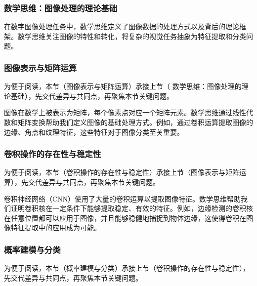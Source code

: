 \subsubsection{  数学思维：图像处理的理论基础}



在数字图像处理任务中，数学思维定义了图像数据的处理方式以及背后的理论框架。数学思维关注图像的特性和转化，将复杂的视觉任务抽象为特征提取和分类问题。
\subsubsection*{图像表示与矩阵运算}


为便于阅读，本节（图像表示与矩阵运算）承接上节（  数学思维：图像处理的理论基础），先交代差异与共同点，再聚焦本节关键问题。

图像在数学上被表示为矩阵，每个像素点对应一个矩阵元素。数学思维通过线性代数和矩阵变换帮助我们定义图像的基础处理方式。例如，通过卷积运算提取图像的边缘、角点和纹理特征，这些特征对于图像分类至关重要。
\subsubsection*{卷积操作的存在性与稳定性}


为便于阅读，本节（卷积操作的存在性与稳定性）承接上节（图像表示与矩阵运算），先交代差异与共同点，再聚焦本节关键问题。

卷积神经网络（CNN）使用了大量的卷积运算以提取图像特征。数学思维帮助我们证明卷积核在一定条件下能够提取稳定、有效的特征。例如，边缘检测的卷积核在任意位置都可以应用于图像，并且能够稳健地捕捉到物体边缘，这使得卷积在图像特征提取中的应用成为可能。
\subsubsection*{概率建模与分类}


为便于阅读，本节（概率建模与分类）承接上节（卷积操作的存在性与稳定性），先交代差异与共同点，再聚焦本节关键问题。


